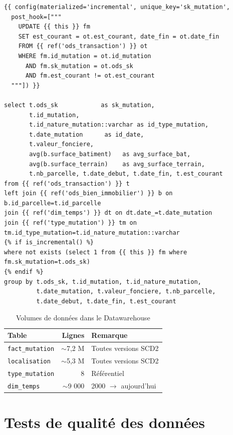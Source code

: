 \documentclass[12pt,a4paper]{article}
\let\oldsection\section
\renewcommand{\section}{\clearpage\oldsection}
\begin{document}
\begin{lstlisting}[language=Jinja, caption={fact\_mutation.sql -- post\_hook de synchronisation SCD2}]
{{ config(materialized='incremental', unique_key='sk_mutation',
  post_hook=["""
    UPDATE {{ this }} fm
    SET est_courant = ot.est_courant, date_fin = ot.date_fin
    FROM {{ ref('ods_transaction') }} ot
    WHERE fm.id_mutation = ot.id_mutation
      AND fm.sk_mutation = ot.ods_sk
      AND fm.est_courant != ot.est_courant
  """]) }}

select t.ods_sk            as sk_mutation,
       t.id_mutation,
       t.id_nature_mutation::varchar as id_type_mutation,
       t.date_mutation      as id_date,
       t.valeur_fonciere,
       avg(b.surface_batiment)   as avg_surface_bat,
       avg(b.surface_terrain)    as avg_surface_terrain,
       t.nb_parcelle, t.date_debut, t.date_fin, t.est_courant
from {{ ref('ods_transaction') }} t
left join {{ ref('ods_bien_immobilier') }} b on b.id_parcelle=t.id_parcelle
join {{ ref('dim_temps') }} dt on dt.date_=t.date_mutation
join {{ ref('type_mutation') }} tm on tm.id_type_mutation=t.id_nature_mutation::varchar
{% if is_incremental() %}
where not exists (select 1 from {{ this }} fm where fm.sk_mutation=t.ods_sk)
{% endif %}
group by t.ods_sk, t.id_mutation, t.id_nature_mutation,
         t.date_mutation, t.valeur_fonciere, t.nb_parcelle,
         t.date_debut, t.date_fin, t.est_courant
\end{lstlisting}

\begin{table}[H]
  \centering
  \begin{tabularx}{\linewidth}{lrl}
    \toprule
    \textbf{Table} & \textbf{Lignes} & \textbf{Remarque} \\
    \midrule
    \texttt{fact\_mutation} & $\sim$7,2 M & Toutes versions SCD2 \\
    \texttt{localisation}   & $\sim$5,3 M & Toutes versions SCD2 \\
    \texttt{type\_mutation} & 8           & Référentiel \\
    \texttt{dim\_temps}     & $\sim$9 000 & 2000 $\to$ aujourd'hui \\
    \bottomrule
  \end{tabularx}
  \caption{Volumes de données dans le Datawarehouse}
\end{table}

\section{Tests de qualité des données}
\end{document}
